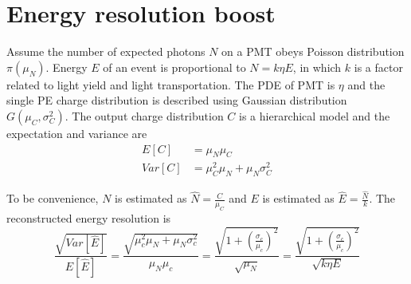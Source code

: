 \section{Energy resolution boost}
\label{Result}
Assume the number of expected photons $N$ on a PMT obeys Poisson distribution $\pi(\mu_N)$. Energy $E$ of an event is proportional to $N=k\eta E$, in which $k$ is a factor related to light yield and light transportation. The PDE of PMT is $\eta$ and the single PE charge distribution is described using Gaussian distribution $G(\mu_C,\sigma_C^2)$. The output charge distribution $C$ is a hierarchical model and the expectation and variance are
\begin{align}
    E[C]&=\mu_N\mu_C\\
    Var[C]&=\mu_C^2\mu_N+\mu_N\sigma_C^2
\end{align}

To be convenience, $N$ is estimated as $\hat{N}=\frac{C}{\mu_C}$ and $E$ is estimated as $\hat{E}=\frac{\hat{N}}{k}$. The reconstructed energy resolution is 
\begin{equation}
    \frac{\sqrt{Var[\hat{E}]}}{E[\hat{E}]}=\frac{\sqrt{\mu_c^2\mu_N+\mu_N\sigma_c^2}}{\mu_N\mu_c}=\frac{\sqrt{1+(\frac{\sigma_c}{\mu_c})^2}}{\sqrt{\mu_N}}=\frac{\sqrt{1+(\frac{\sigma_c}{\mu_c})^2}}{\sqrt{k\eta E}}
\end{equation}

